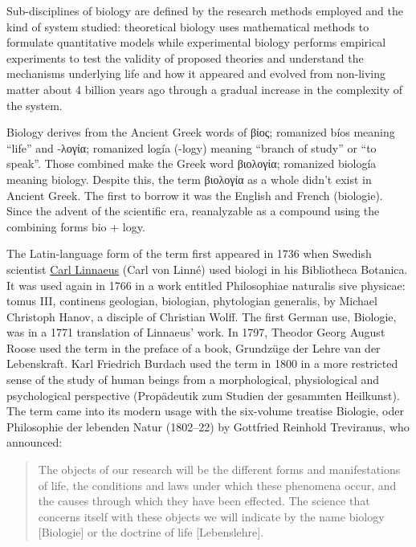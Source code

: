 Sub-disciplines of biology are defined by the research methods employed and the kind of system studied: theoretical biology uses mathematical methods to formulate quantitative models while experimental biology performs empirical experiments to test the validity of proposed theories and understand the mechanisms underlying life and how it appeared and evolved from non-living matter about 4 billion years ago through a gradual increase in the complexity of the system.

Biology derives from the Ancient Greek words of βίος; romanized bíos meaning ``life'' and -λογία; romanized logía (-logy) meaning ``branch of study'' or ``to speak''. Those combined make the Greek word βιολογία; romanized biología meaning biology. Despite this, the term βιολογία as a whole didn't exist in Ancient Greek. The first to borrow it was the English and French (biologie). Since the advent of the scientific era, reanalyzable as a compound using the combining forms bio + logy.

The Latin-language form of the term first appeared in 1736 when Swedish scientist \href{https://en.wikipedia.org/wiki/Carl_Linnaeus}{Carl Linnaeus} (Carl von Linné) used biologi in his Bibliotheca Botanica. It was used again in 1766 in a work entitled Philosophiae naturalis sive physicae: tomus III, continens geologian, biologian, phytologian generalis, by Michael Christoph Hanov, a disciple of Christian Wolff. The first German use, Biologie, was in a 1771 translation of Linnaeus' work. In 1797, Theodor Georg August Roose used the term in the preface of a book, Grundzüge der Lehre van der Lebenskraft. Karl Friedrich Burdach used the term in 1800 in a more restricted sense of the study of human beings from a morphological, physiological and psychological perspective (Propädeutik zum Studien der gesammten Heilkunst). The term came into its modern usage with the six-volume treatise Biologie, oder Philosophie der lebenden Natur (1802--22) by Gottfried Reinhold Treviranus, who announced:

\begin{quote}
The objects of our research will be the different forms and manifestations of life, the conditions and laws under which these phenomena occur, and the causes through which they have been effected. The science that concerns itself with these objects we will indicate by the name biology {[}Biologie{]} or the doctrine of life {[}Lebenslehre{]}.
\end{quote}


